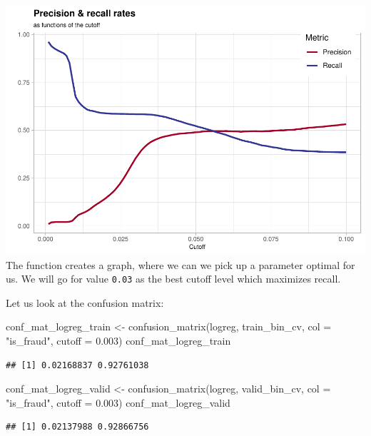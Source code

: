 \documentclass[
]{report}
\newenvironment{Shaded}{\begin{snugshade}}{\end{snugshade}}
\newcommand{\AttributeTok}[1]{\textcolor[rgb]{0.77,0.63,0.00}{#1}}
\newcommand{\FloatTok}[1]{\textcolor[rgb]{0.00,0.00,0.81}{#1}}
\newcommand{\FunctionTok}[1]{\textcolor[rgb]{0.00,0.00,0.00}{#1}}
\newcommand{\NormalTok}[1]{#1}
\newcommand{\OtherTok}[1]{\textcolor[rgb]{0.56,0.35,0.01}{#1}}
\newcommand{\StringTok}[1]{\textcolor[rgb]{0.31,0.60,0.02}{#1}}
\begin{document}
\includegraphics{credit_card_fraud_detection_files/figure-latex/cutoff_lvl-1.pdf}
The function creates a graph, where we can we pick up a parameter
optimal for us. We will go for value \texttt{0.03} as the best cutoff
level which maximizes recall.

Let us look at the confusion matrix:

\begin{Shaded}
\begin{Highlighting}[]
\NormalTok{conf\_mat\_logreg\_train }\OtherTok{\textless{}{-}} 
  \FunctionTok{confusion\_matrix}\NormalTok{(logreg, train\_bin\_cv, }\AttributeTok{col =} \StringTok{"is\_fraud"}\NormalTok{, }\AttributeTok{cutoff =} \FloatTok{0.003}\NormalTok{)}
\NormalTok{conf\_mat\_logreg\_train}
\end{Highlighting}
\end{Shaded}

\begin{verbatim}
## [1] 0.02168837 0.92761038
\end{verbatim}

\begin{Shaded}
\begin{Highlighting}[]
\NormalTok{conf\_mat\_logreg\_valid }\OtherTok{\textless{}{-}} 
  \FunctionTok{confusion\_matrix}\NormalTok{(logreg, valid\_bin\_cv, }\AttributeTok{col =} \StringTok{"is\_fraud"}\NormalTok{, }\AttributeTok{cutoff =} \FloatTok{0.003}\NormalTok{)}
\NormalTok{conf\_mat\_logreg\_valid}
\end{Highlighting}
\end{Shaded}

\begin{verbatim}
## [1] 0.02137988 0.92866756
\end{verbatim}
\end{document}
